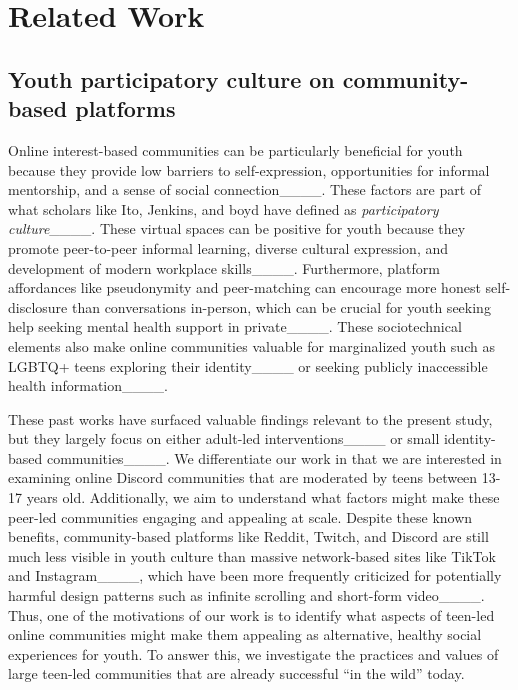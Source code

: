 \section{Related Work}
\subsection{Youth participatory culture on community-based platforms}
Online interest-based communities can be particularly beneficial for youth because they provide low barriers to self-expression, opportunities for informal mentorship, and a sense of social connection____. These factors are part of what scholars like Ito, Jenkins, and boyd have defined as \textit{participatory culture}____. These virtual spaces can be positive for youth because they promote peer-to-peer informal learning, diverse cultural expression, and development of modern workplace skills____. Furthermore, platform affordances like pseudonymity and peer-matching can encourage more honest self-disclosure than conversations in-person, which can be crucial for youth seeking help seeking mental health support in private____. These sociotechnical elements also make online communities valuable for marginalized youth such as LGBTQ+ teens exploring their identity____ or seeking publicly inaccessible health information____. 

These past works have surfaced valuable findings relevant to the present study, but they largely focus on either adult-led interventions____ or small identity-based communities____. We differentiate our work in that we are interested in examining online Discord communities that are moderated by teens between 13-17 years old. Additionally, we aim to understand what factors might make these peer-led communities engaging and appealing at scale. Despite these known benefits, community-based platforms like Reddit, Twitch, and Discord are still much less visible in youth culture than massive network-based sites like TikTok and Instagram____, which have been more frequently criticized for potentially harmful design patterns such as infinite scrolling and short-form video____. Thus, one of the motivations of our work is to identify what aspects of teen-led online communities might make them appealing as alternative, healthy social experiences for youth. To answer this, we investigate the practices and values of large teen-led communities that are already successful ``in the wild'' today. 

